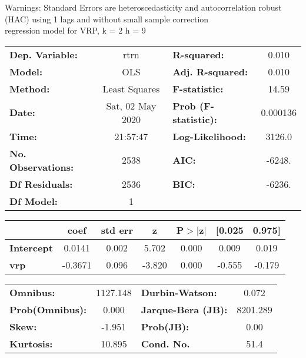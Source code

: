 Warnings: \newline
 [1] Standard Errors are heteroscedasticity and autocorrelation robust (HAC) using 1 lags and without small sample correction\\ 

regression model for VRP, k = 2 h = 9\begin{center}
\begin{tabular}{lclc}
\toprule
\textbf{Dep. Variable:}    &       rtrn       & \textbf{  R-squared:         } &     0.010   \\
\textbf{Model:}            &       OLS        & \textbf{  Adj. R-squared:    } &     0.010   \\
\textbf{Method:}           &  Least Squares   & \textbf{  F-statistic:       } &     14.59   \\
\textbf{Date:}             & Sat, 02 May 2020 & \textbf{  Prob (F-statistic):} &  0.000136   \\
\textbf{Time:}             &     21:57:47     & \textbf{  Log-Likelihood:    } &    3126.0   \\
\textbf{No. Observations:} &        2538      & \textbf{  AIC:               } &    -6248.   \\
\textbf{Df Residuals:}     &        2536      & \textbf{  BIC:               } &    -6236.   \\
\textbf{Df Model:}         &           1      & \textbf{                     } &             \\
\bottomrule
\end{tabular}
\begin{tabular}{lcccccc}
                   & \textbf{coef} & \textbf{std err} & \textbf{z} & \textbf{P$> |$z$|$} & \textbf{[0.025} & \textbf{0.975]}  \\
\midrule
\textbf{Intercept} &       0.0141  &        0.002     &     5.702  &         0.000        &        0.009    &        0.019     \\
\textbf{vrp}       &      -0.3671  &        0.096     &    -3.820  &         0.000        &       -0.555    &       -0.179     \\
\bottomrule
\end{tabular}
\begin{tabular}{lclc}
\textbf{Omnibus:}       & 1127.148 & \textbf{  Durbin-Watson:     } &    0.072  \\
\textbf{Prob(Omnibus):} &   0.000  & \textbf{  Jarque-Bera (JB):  } & 8201.289  \\
\textbf{Skew:}          &  -1.951  & \textbf{  Prob(JB):          } &     0.00  \\
\textbf{Kurtosis:}      &  10.895  & \textbf{  Cond. No.          } &     51.4  \\
\bottomrule
\end{tabular}
\end{center}

